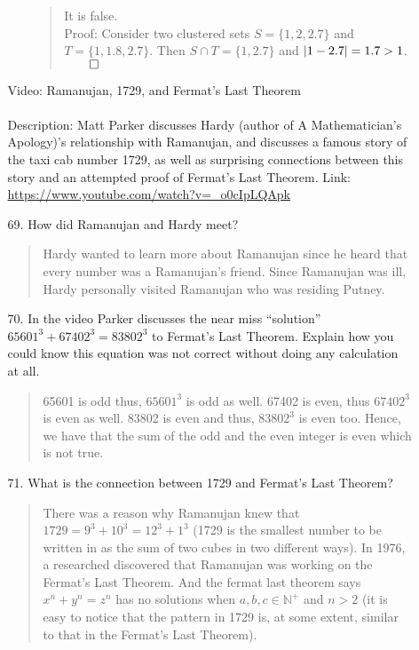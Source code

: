 \documentclass[12pt, a4paper]{article}                      %
\newcommand{\pnats}{\mathbb{N}^+}
\DeclarePairedDelimiter\abs{\lvert}{\rvert}
\begin{document}
\begin{itemize}
\begin{itemize}
\begin{itemize}
\begin{quote}
It is false.\\
Proof: Consider two clustered sets $S = \{1, 2, 2.7\}$ and $T = \{1, 1.8, 2.7\}$.
Then $S \cap T = \{1, 2.7\}$ and $\abs{1 - 2.7} = 1.7 > 1$.
$\qed$
\end{quote}
\end{itemize}
\item[]
\item[]
\item[]
{\Large Video: Ramanujan, 1729, and Fermat’s Last Theorem}
\\\\
Description: Matt Parker discusses Hardy (author of A Mathematician’s Apology)’s relationship with Ramanujan,
and discusses a famous story of the taxi cab number 1729, as well as surprising connections between this story and an attempted proof of Fermat’s Last Theorem.
Link: \url{https://www.youtube.com/watch?v=_o0cIpLQApk}
\item[]
\item[69.]
How did Ramanujan and Hardy meet?
\begin{quote}
Hardy wanted to learn more about Ramanujan since he heard that every number was a Ramanujan's friend.
Since Ramanujan was ill, Hardy personally visited Ramanujan who was residing Putney.
\end{quote}
\item[]
\item[70.]
In the video Parker discusses the near miss “solution” $65601^3 + 67402^3 = 83802^3$
to Fermat’s Last Theorem. Explain how you could know this equation was not correct
without doing any calculation at all.
\begin{quote}
65601 is odd thus, $65601^3$ is odd as well. 67402 is even, thus $67402^3$ is even as well.
83802 is even and thus, $83802^3$ is even too. Hence, we have that the sum of the odd and
the even integer is even which is not true.
\end{quote}
\item[]
\item[71.]
What is the connection between 1729 and Fermat’s Last Theorem?
\begin{quote}
There was a reason why Ramanujan knew that $1729 = 9^3 + 10^3 = 12^3 + 1^3$ (1729 is the smallest number
to be written in as the sum of two cubes in two different ways). In 1976, a researched discovered that Ramanujan
was working on the Fermat's Last Theorem. And the fermat last theorem says $x^n + y^n = z^n$ has no solutions
when $a, b, c \in \pnats$ and $n > 2$ (it is easy to notice that the pattern in 1729 is, at some extent, similar to that in the Fermat’s Last Theorem).
\end{quote}
\newpage


\end{itemize}
\end{itemize}
\end{document}
